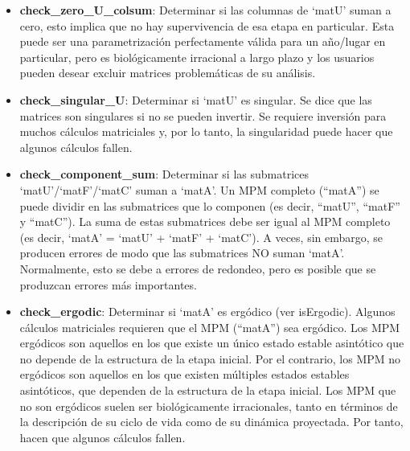 \documentclass[
  12pt,
  letterpaper,
]{book}
\begin{document}
\begin{itemize}
  (incluido `NA'). Las submatrices compuestas enteramente de valores
  cero pueden resultar problemáticas. Puede haber buenas razones
  biológicas para este fenómeno o que se asocien con preguntas
  científicas específicas. Por ejemplo, en la población particular en el
  año particular, realmente no se registró reproducción. Sin embargo,
  las submatrices con valores de cero pueden provocar que algunos
  cálculos fallen y puede ser necesario excluirlas. En otros estudios no
  se evaluó la fecundidad ya que estos parámetros no eran necesarios
  para contestar las preguntas científicas.
\item
  \textbf{check\_zero\_U\_colsum}: Determinar si las columnas de `matU'
  suman a cero, esto implica que no hay supervivencia de esa etapa en
  particular. Esta puede ser una parametrización perfectamente válida
  para un año/lugar en particular, pero es biológicamente irracional a
  largo plazo y los usuarios pueden desear excluir matrices
  problemáticas de su análisis.
\item
  \textbf{check\_singular\_U}: Determinar si `matU' es singular. Se dice
  que las matrices son singulares si no se pueden invertir. Se requiere
  inversión para muchos cálculos matriciales y, por lo tanto, la
  singularidad puede hacer que algunos cálculos fallen.
\item
  \textbf{check\_component\_sum}: Determinar si las submatrices
  `matU'/`matF'/`matC' suman a `matA'. Un MPM completo (``matA'') se
  puede dividir en las submatrices que lo componen (es decir, ``matU'',
  ``matF'' y ``matC''). La suma de estas submatrices debe ser igual al
  MPM completo (es decir, `matA' = `matU' + `matF' + `matC'). A veces,
  sin embargo, se producen errores de modo que las submatrices NO suman
  `matA'. Normalmente, esto se debe a errores de redondeo, pero es
  posible que se produzcan errores más importantes.
\item
  \textbf{check\_ergodic}: Determinar si `matA' es ergódico (ver
  isErgodic). Algunos cálculos matriciales requieren que el MPM
  (``matA'') sea ergódico. Los MPM ergódicos son aquellos en los que
  existe un único estado estable asintótico que no depende de la
  estructura de la etapa inicial. Por el contrario, los MPM no ergódicos
  son aquellos en los que existen múltiples estados estables
  asintóticos, que dependen de la estructura de la etapa inicial. Los
  MPM que no son ergódicos suelen ser biológicamente irracionales, tanto
  en términos de la descripción de su ciclo de vida como de su dinámica
  proyectada. Por tanto, hacen que algunos cálculos fallen.

\end{itemize}
\end{document}
